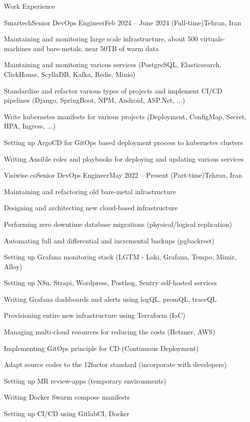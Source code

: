 \documentclass[]{main}
\begin{document}
\newpage

\begin{section}{Work Experience}
 \begin{subsection}{Smartech}{Senior DevOps Engineer}{Feb 2024 -- June 2024 (Full-time)}{Tehran, Iran}
     \item Maintaining and monitoring large scale infrastructure, about 500 virtuals-machines and bare-metals, near 50TB of warm data
     \item Maintaining and monitoring various services (PostgreSQL, Elasticsearch, ClickHouse, ScyllaDB, Kafka, Redis, Minio)
     \item Standardize and refactor various types of projects and implement CI/CD pipelines (Django, SpringBoot, NPM, Android, ASP.Net, ...)
     \item Write kubernetes manifests for various projects (Deployment, ConfigMap, Secret, HPA, Ingress, ...)
     \item Setting up ArgoCD for GitOps based deployment process to kubernetes clusters
     \item Writing Ansible roles and playbooks for deploying and updating various services
 \end{subsection}
 
 \begin{subsection}{Visiwise.co}{Senior DevOps Engineer}{May 2022 -- Present (Part-time)}{Tehran, Iran}
     \item Maintaining and refactoring old bare-metal infrastructure
     \item Designing and architecting new cloud-based infrastructure
     \item Performing zero downtime database migrations (physical/logical replication)
     \item Automating full and differential and incremental backups (pgbackrest)
     \item Setting up Grafana monitoring stack (LGTM - Loki, Grafana, Tempo, Mimir, Alloy)
     \item Setting up N8n, Strapi, Wordpress, Posthog, Sentry self-hosted services
     \item Writing Grafana dashboards and alerts using logQL, promQL, traceQL
     \item Provisioning entire new infrastructure using Terraform (IaC)
     \item Managing multi-cloud resources for reducing the costs (Hetzner, AWS)
     \item Implementing GitOps principle for CD (Continuous Deployment)
     \item Adapt source codes to the 12factor standard (incorporate with developers)
     \item Setting up MR review-apps (temporary environments)
     \item Writing Docker Swarm compose manifests
     \item Setting up CI/CD using GitlabCI, Docker
 \end{subsection}
 

\end{section}
\end{document}

